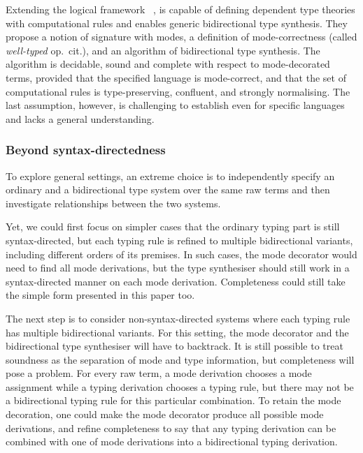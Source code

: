Extending the logical framework \Dedukti~\cite{Assaf2016},  is capable of defining dependent type theories with computational rules and enables generic bidirectional type synthesis.
They propose a notion of \LF signature with modes, a definition of mode-correctness (called \emph{well-typed} op.\ cit.), and an algorithm of bidirectional type synthesis.
The algorithm is decidable, sound and complete with respect to mode-decorated terms, provided that the specified language is mode-correct, and that the set of computational rules is type-preserving, confluent, and strongly normalising.
The last assumption, however, is challenging to establish even for specific languages and lacks a general understanding.

\subsubsection{Beyond syntax-directedness}

To explore general settings, an extreme choice is to independently specify an ordinary and a bidirectional type system over the same raw terms and then investigate relationships between the two systems.

Yet, we could first focus on simpler cases that the ordinary typing part is still syntax-directed, but each typing rule is refined to multiple bidirectional variants, including different orders of its premises.
In such cases, the mode decorator would need to find all mode derivations, but the type synthesiser should still work in a syntax-directed manner on each mode derivation.
Completeness could still take the simple form presented in this paper too.

The next step is to consider non-syntax-directed systems where each typing rule has multiple bidirectional variants.
For this setting, the mode decorator and the bidirectional type synthesiser will have to backtrack.
It is still possible to treat soundness as the separation of mode and type information, but completeness will pose a problem.
For every raw term, a mode derivation chooses a mode assignment while a typing derivation chooses a typing rule, but there may not be a bidirectional typing rule for this particular combination.
To retain the mode decoration, one could make the mode decorator produce all possible mode derivations, and refine completeness to say that any typing derivation can be combined with one of mode derivations into a bidirectional typing derivation.


